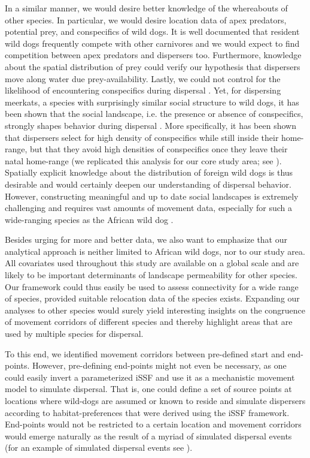 \documentclass[abstract=on,10pt,a4paper,bibliography=totocnumbered]{scrartcl}
\begin{document}
In a similar manner, we would desire better knowledge of the whereabouts of
other species. In particular, we would desire location data of apex predators,
potential prey, and conspecifics of wild dogs. It is well documented that
resident wild dogs frequently compete with other carnivores \citep{Creel.1998}
and we would expect to find competition between apex predators and dispersers
too. Furthermore, knowledge about the spatial distribution of prey could verify
our hypothesis that dispersers move along water due prey-availability. Lastly,
we could not control for the likelihood of encountering conspecifics during
dispersal . Yet, for dispersing meerkats, a species with surprisingly similar
social structure to wild dogs, it has been shown that the social landscape, i.e.
the presence or absence of conspecifics, strongly shapes behavior during
dispersal \citep{Cozzi.2018}. More specifically, it has been shown that
dispersers select for high density of conspecifics while still inside their
home-range, but that they avoid high densities of conspecifics once they leave
their natal home-range (we replicated this analysis for our core study area; see
). Spatially explicit knowledge about the
distribution of foreign wild dogs is thus desirable and would certainly deepen
our understanding of dispersal behavior. However, constructing meaningful and up
to date social landscapes is extremely challenging and requires vast amounts of
movement data, especially for such a wide-ranging species as the African wild
dog \citep{Pomilia.2015}.

Besides urging for more and better data, we also want to emphasize that our
analytical approach is neither limited to African wild dogs, nor to our study
area. All covariates used throughout this study are available on a global scale
and are likely to be important determinants of landscape permeability for other
species. Our framework could thus easily be used to assess connectivity for a
wide range of species, provided suitable relocation data of the species exists.
Expanding our analyses to other species would surely yield interesting insights
on the congruence of movement corridors of different species and thereby
highlight areas that are used by multiple species for dispersal.

To this end, we identified movement corridors between pre-defined start and
end-points. However, pre-defining end-points might not even be necessary, as one
could easily invert a parameterized iSSF and use it as a mechanistic movement
model to simulate dispersal. That is, one could define a set of source points at
locations where wild-dogs are assumed or known to reside and simulate dispersers
according to habitat-preferences that were derived using the iSSF framework.
End-points would not be restricted to a certain location and movement corridors
would emerge naturally as the result of a myriad of simulated dispersal events
(for an example of simulated dispersal events see
).
\end{document}
